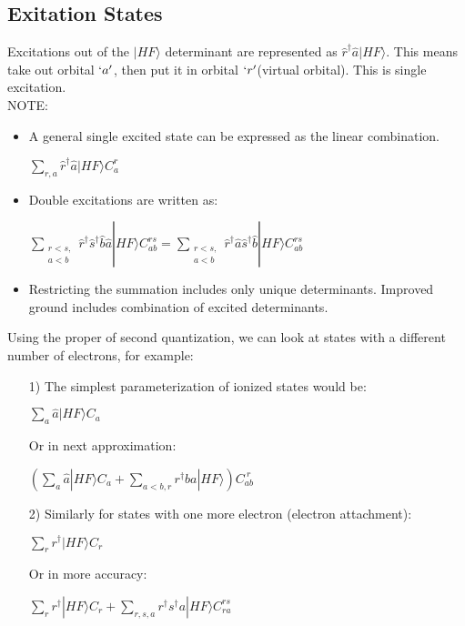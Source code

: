 \documentclass[a4paper, 12pt]{article}
\begin{document}
\subsection{Exitation States}
Excitations out of the $|HF\rangle$ determinant are represented as $\hat{r}^\dagger \hat{a}|HF \rangle$. This means take out orbital $`a'$, then put it in orbital $`r'$(virtual orbital). This is single excitation.\\
\tab NOTE:
\begin{itemize}
	\item   A general single excited state can be expressed as the linear combination.
	\begin{center}
		$\sum_{r,a}\hat{r}^\dagger\hat{a}|HF\rangle C_a^r$
	\end{center}
	\item Double excitations are written as: 
		\begin{center}
		$\sum_{\substack{r<s,\\a<b}}\hat{r}^\dagger \hat{s}^\dagger \hat{b} \hat{a}|HF\rangle C_{ab}^{rs} = \sum_{\substack{r<s,\\a<b}}\hat{r}^\dagger \hat{a} \hat{s}^\dagger \hat{b}|HF\rangle C_{ab}^{rs}$
	\end{center}
	\item  Restricting the summation includes only unique determinants. Improved ground includes combination of excited determinants.
\end{itemize}

Using the proper of second quantization, we can look at states with a different number of electrons, for example:
\begin{itemize}
	\item[1)]  The simplest parameterization of ionized states would be: 
	\begin{center}
		$\sum_a \hat{a}|HF\rangle C_a $
	\end{center} 
	Or in next approximation:
	\begin{center}
		 $(\sum_a\hat{a}|HF\rangle C_a+\sum_{a<b,r}r^\dagger ba|HF\rangle )C_{ab}^{ \ r}$
	\end{center}
	\item[2)] Similarly for states with one more electron (electron attachment):
	\begin{center}
		$\sum_r r^\dagger |HF\rangle C_r $
	\end{center}
	Or in more accuracy:
	\begin{center}
		$\sum_r r^\dagger|HF\rangle C_r + \sum_{r,s,a} r^\dagger s^\dagger a|HF\rangle C_{ra}^{rs}  $
	\end{center}
\end{itemize}
\end{document}

